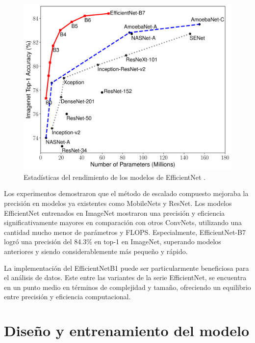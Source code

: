    \begin{figure}[H]
      \begin{center}
      \includegraphics[width=1\textwidth]{./Graphics/efficientnet_performance.png}
      \caption{Estadísticas del rendimiento de los modelos de EfficientNet .}
      \label{fig:efficientnet_performance}
      \end{center}
      \end{figure}

Los experimentos demostraron que el método de escalado compuesto mejoraba la precisión en modelos ya existentes como MobileNets y ResNet. Los modelos EfficientNet entrenados en ImageNet mostraron una precisión y eficiencia significativamente mayores en comparación con otros ConvNets, utilizando una cantidad mucho menor de parámetros y FLOPS. Especialmente, EfficientNet-B7 logró una precisión del 84.3\% en top-1 en ImageNet, superando modelos anteriores y siendo considerablemente más pequeño y rápido.

La implementación del EfficientNetB1 puede ser particularmente beneficiosa para el análisis de datos. Este entre las variantes de la serie EfficientNet, se encuentra en un punto medio en términos de complejidad y tamaño, ofreciendo un equilibrio entre precisión y eficiencia computacional.

\section{Diseño y entrenamiento del modelo}

